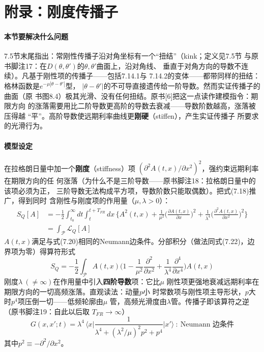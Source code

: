 \section{附录：刚度传播子}

\paragraph{本节要解决什么问题}
7.5节末尾指出：常刚性传播子沿对角坐标有一个“扭结”（kink；定义见7.5节
与原书脚注17：在$D(\theta,\theta')$的$\theta,\theta'$曲面上，沿对角线、
垂直于对角方向的导数不连续）。凡基于刚性项的传播子——包括7.14.1与
7.14.2的变体——都带同样的扭结：格林函数是$e^{-\mu|\theta-\theta'|}$型，
$|\theta-\theta'|$的不可导直接遗传给一阶导数。然而实证传播子的曲面（原
书图8.4）极其光滑、没有任何扭结。原书[6]把这一点读作建模指令：期限方向
的涨落需要用比二阶导数更高阶的导数去衰减——导数阶数越高，涨落被压得越
“平”。高阶导数使远期利率曲线更\textbf{刚硬}（stiffen），产生实证传播子
所要求的光滑行为。

\paragraph{模型设定}
在拉格朗日量中加一个\textbf{刚度}（stiffness）项
$(\partial^{2}A(t,x)/\partial x^{2})^{2}$，强约束远期利率在期限方向的任
何涨落（为什么不是三阶导数——原书脚注18：拉格朗日量中的该项必须为正，
三阶导数无法构成平方项，导数阶数只能取偶数）。把式(7.18)推广，得到同时
含刚性与刚度项的作用量（$\mu,\lambda>0$）：
\begin{align*}
S_{Q}[A]&=-\frac{1}{2}\int_{t_{0}}^{\infty}dt\int_{t}^{t+T_{FR}}dx\,
\Biggl\{A^{2}(t,x)+\frac{1}{\mu^{2}}\biggl(\frac{\partial A(t,x)}{\partial x}
\biggr)^{2}
+\frac{1}{\lambda^{4}}\biggl(\frac{\partial^{2}A(t,x)}{\partial x^{2}}
\biggr)^{2}\Biggr\}\\
&=\int_{\mathcal{P}}\mathcal{L}_{Q}[A]
\tag{7.73}
\end{align*}
$A(t,x)$满足与式(7.20)相同的Neumann边条件。分部积分（做法同式(7.22)，边
界项为零）得算符形式
\begin{equation*}
S_{Q}=-\frac{1}{2}\int_{\mathcal{P}}A(t,x)\biggl(1-\frac{1}{\mu^{2}}
\frac{\partial^{2}}{\partial x^{2}}+\frac{1}{\lambda^{4}}
\frac{\partial^{4}}{\partial x^{4}}\biggr)A(t,x)
\tag{7.74}
\end{equation*}
刚度$\lambda\ (\neq\infty)$在作用量中引入\textbf{四阶导数}项：它比$\mu$
刚性项更强地衰减远期利率在期限方向的一切高频涨落。直观读法：动量$p$小
时常数项与刚性项主导形状，$p$大时$p^{4}$项压倒一切——低频轮廓由$\mu$
管，高频光滑度由$\lambda$管。传播子即该算符之逆（原书脚注19：自此以后取
$T_{FR}\to\infty$）
\begin{equation*}
G(x,x';t)=\lambda^{4}\,\biggl\langle x\biggl|
\frac{1}{\lambda^{4}+(\lambda^{2}/\mu)^{2}p^{2}+p^{4}}
\biggr|x'\biggr\rangle\ :\ \text{Neumann 边条件}
\tag{7.75}
\end{equation*}
其中$p^{2}\equiv-\partial^{2}/\partial x^{2}$。

